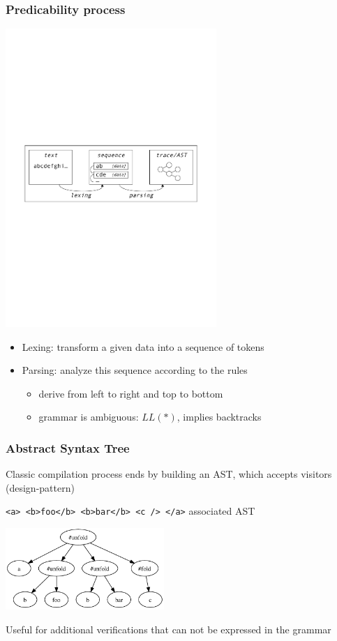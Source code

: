 \documentclass[9pt]{beamer}
\newcommand{\code}[1]{\texttt{#1}}
\begin{document}
\begin{frame}
\frametitle{Predicability process}

\begin{center}
\includegraphics[width=8cm]{Figures/Compiling_process.pdf}
\end{center}
\begin{itemize}
\item Lexing: transform a given data into a sequence of tokens
\item Parsing: analyze this sequence according to the rules
  \begin{itemize}
  \item derive from left to right and top to bottom
  \item grammar is ambiguous: $LL(*)$, implies backtracks
  \end{itemize}
\end{itemize}

\end{frame}

\begin{frame}
\frametitle{Abstract Syntax Tree}

Classic compilation process ends by building an AST, which accepts visitors
(design-pattern) \\
\begin{exampleblock}{\code{<a> <b>foo</b> <b>bar</b> <c /> </a>} associated AST}
\begin{center}
\includegraphics[width=6cm]{Figures/AST.pdf}
\end{center}
\end{exampleblock}
Useful for additional verifications that can not be expressed in the grammar

\end{frame}
\end{document}
